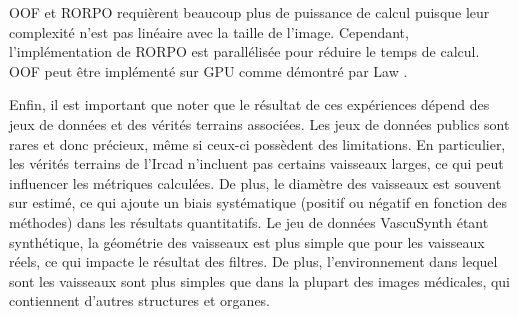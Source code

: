 OOF et RORPO requièrent beaucoup plus de puissance de calcul puisque leur complexité n'est pas linéaire avec la taille de l'image. Cependant, l'implémentation de RORPO est parallélisée pour réduire le temps de calcul. OOF peut être implémenté sur GPU comme démontré par Law \cite{Law2009_efficient_implementation}.

Enfin, il est important que noter que le résultat de ces expériences dépend des jeux de données et des vérités terrains associées. Les jeux de données publics sont rares et donc précieux, même si ceux-ci possèdent des limitations. En particulier, les vérités terrains de l'Ircad n'incluent pas certains vaisseaux larges, ce qui peut influencer les métriques calculées. De plus, le diamètre des vaisseaux est souvent sur estimé, ce qui ajoute un biais systématique (positif ou négatif en fonction des méthodes) dans les résultats quantitatifs. Le jeu de données VascuSynth étant synthétique, la géométrie des vaisseaux est plus simple que pour les vaisseaux réels, ce qui impacte le résultat des filtres. De plus, l'environnement dans lequel sont les vaisseaux sont plus simples que dans la plupart des images médicales, qui contiennent d'autres structures et organes.



